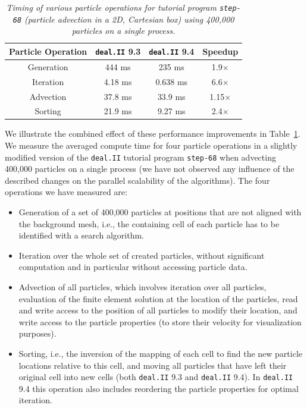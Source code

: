 \documentclass{ansarticle-preprint}
\newcommand{\specialword}[1]{\texttt{#1}}
\newcommand{\dealii}{{\specialword{deal.II}}\xspace}
\begin{document}
\begin{table}
  \caption{\it Timing of various particle operations for tutorial program \texttt{step-68} (particle advection in a 2D, Cartesian box) using 400,000 particles on a single process.}
  \label{tab:particle_timing}

  \centering
  \begin{tabular}{|c|c|c|c|}
    \hline
   Particle Operation & \dealii 9.3 & \dealii 9.4 & Speedup \\
   \hline
   Generation & 444 ms & 235 ms & 1.9$\times$ \\
   Iteration & 4.18 ms & 0.638 ms & 6.6$\times$ \\
   Advection & 37.8 ms & 33.9 ms & 1.15$\times$ \\
   Sorting & 21.9 ms & 9.27 ms & 2.4$\times$ \\
   \hline
  \end{tabular}
  \end{table}

We illustrate the combined effect of these performance improvements in Table~\ref{tab:particle_timing}. We measure the averaged compute time for four particle operations in a slightly modified version of the \dealii tutorial program \texttt{step-68} when advecting 400,000 particles on a single process (we have not observed any influence of the described changes on the parallel scalability of the algorithms).
The four operations we have measured are:
\begin{itemize}
\item Generation of a set of 400,000 particles at positions that are not aligned with the background mesh, i.e., the containing cell of each particle has to be identified with a search algorithm.
\item Iteration over the whole set of created particles, without
  significant computation and in particular without accessing particle data.
\item Advection of all particles, which involves iteration over all particles, evaluation of the finite element solution at the location of the particles, read and write access to the position of all particles to modify their location, and write access to the particle properties (to store their velocity for visualization purposes).
\item Sorting, i.e., the inversion of the mapping of each cell to find the new particle locations relative to this cell, and moving all particles that have left their original cell into new cells (both \dealii 9.3 and \dealii 9.4). In \dealii 9.4 this operation also includes reordering the particle properties for optimal iteration.
\end{itemize}
\end{document}
